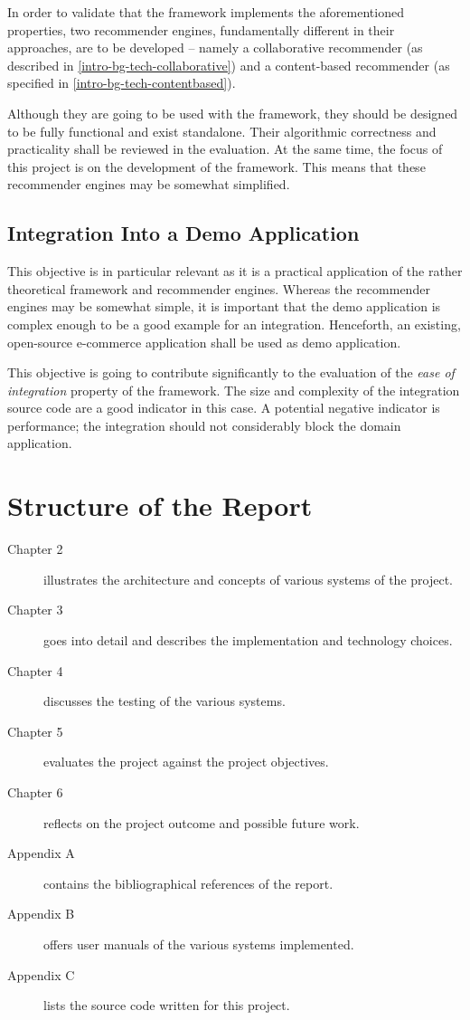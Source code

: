In order to validate that the framework implements the aforementioned properties, two recommender engines, fundamentally different in their approaches, are to be developed -- namely a collaborative recommender (as described in \ref{intro-bg-tech-collaborative}) and a content-based recommender (as specified in \ref{intro-bg-tech-contentbased}).

Although they are going to be used with the framework, they should be designed to be fully functional and exist standalone. Their algorithmic correctness and practicality shall be reviewed in the evaluation. At the same time, the focus of this project is on the development of the framework. This means that these recommender engines may be somewhat simplified.

\subsection{Integration Into a Demo Application}
\label{intro-objectives-demo}

This objective is in particular relevant as it is a practical application of the rather theoretical framework and recommender engines. Whereas the recommender engines may be somewhat simple, it is important that the demo application is complex enough to be a good example for an integration. Henceforth, an existing, open-source e-commerce application shall be used as demo application.

This objective is going to contribute significantly to the evaluation of the \emph{ease of integration} property of the framework. The size and complexity of the integration source code are a good indicator in this case. A potential negative indicator is performance; the integration should not considerably block the domain application.

\section{Structure of the Report}

\begin{description}
    \item[Chapter 2] illustrates the architecture and concepts of various systems of the project.
    \item[Chapter 3] goes into detail and describes the implementation and technology choices.
    \item[Chapter 4] discusses the testing of the various systems.
    \item[Chapter 5] evaluates the project against the project objectives.
    \item[Chapter 6] reflects on the project outcome and possible future work.
    \item[Appendix A] contains the bibliographical references of the report.
    \item[Appendix B] offers user manuals of the various systems implemented.
    \item[Appendix C] lists the source code written for this project.
\end{description}
